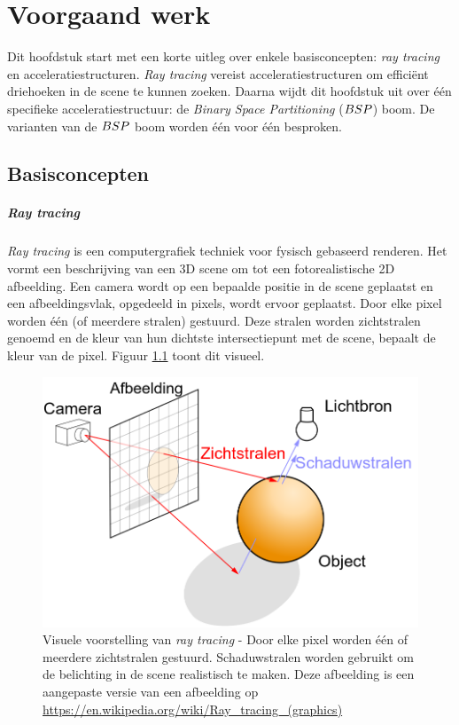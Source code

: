 \chapter{Voorgaand werk}
\label{hoofdstuk:voorgaand-werk}
Dit hoofdstuk start met een korte uitleg over enkele basisconcepten: \textit{ray tracing} en acceleratiestructuren.
\textit{Ray tracing} vereist acceleratiestructuren om efficiënt driehoeken in de scene te kunnen zoeken.
Daarna wijdt dit hoofdstuk uit over één specifieke acceleratiestructuur: de \textit{Binary Space Partitioning} ($BSP$) boom.
De varianten van de $BSP$ boom worden één voor één besproken.

\section{Basisconcepten}
    
    \paragraph{Ray tracing}
    \textit{Ray tracing} is een computergrafiek techniek voor fysisch gebaseerd renderen. Het vormt een beschrijving van een 3D scene om tot een fotorealistische 2D afbeelding. Een camera wordt op een bepaalde positie in de scene geplaatst en een afbeeldingsvlak, opgedeeld in pixels, wordt ervoor geplaatst. Door elke pixel worden één (of meerdere stralen) gestuurd. Deze stralen worden zichtstralen genoemd en de kleur van hun dichtste intersectiepunt met de scene, bepaalt de kleur van de pixel. Figuur \ref{fig:raytracing} toont dit visueel.\\

    \begin{figure}
        \centering
        \includegraphics[width=0.5\linewidth]{img/ray-tracing}
        \caption[Visuele voorstelling van \textit{ray tracing}]%
    {Visuele voorstelling van \textit{ray tracing} - \small Door elke pixel worden één of meerdere zichtstralen gestuurd. Schaduwstralen worden gebruikt om de belichting in de scene realistisch te maken. Deze afbeelding is een aangepaste versie van een afbeelding op \url{https://en.wikipedia.org/wiki/Ray_tracing_(graphics)}}
        \label{fig:raytracing}    
    \end{figure}

